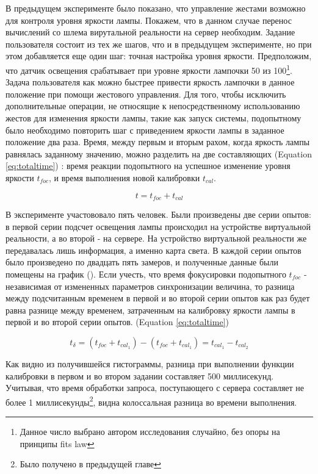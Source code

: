 В предыдущем эксперименте было показано, что управление жестами возможно для контроля уровня яркости лампы. Покажем, что в данном случае перенос вычислений со шлема вирутальной реальности на сервер необходим. Задание пользователя состоит из тех же шагов, что и в предыдущем эксперименте, но при этом добавляется еще один шаг: точная настройка уровня яркости. Предположим, что датчик освещения срабатывает при уровне яркости лампочки 50 из 100\footnote{Данное число выбрано автором исследования случайно, без опоры на принципы fits law}. Задача пользователя как можно быстрее привести яркость лампочки в данное положение при помощи жестового управления. Для того, чтобы исключить дополнительные операции, не относящие к непосредственному использованию жестов для изменения яркости лампы, такие как запуск системы, подопытному было необходимо повторить шаг с приведением яркости лампы в заданное положение два раза. Время, между первым и вторым рахом, когда яркость лампы равнялась заданному значению, можно разделить на две составляющих (Equation \eqref{eq:totaltime}) : время реакции подопытного на успешное изменение уровня яркости $t_{foc}$, и время выполнения новой калибровки $t_{cal}$.

\begin{equation}
  t = t_{foc} + t_{cal}
  \label{eq:totaltime}
\end{equation}

В эксперименте участововало пять человек. Были произведены две серии опытов: в первой серии подсчет освещения лампы происходил на устройстве виртуальной реальности, а во второй - на сервере. На устройство виртуальной реальности же передавалась лишь информация, а именно карта света. В каждой серии опытов было произведено по двадцать пять замеров, и полученные данные были помещены на график (). Если учесть, что время фокусировки подопытного $t_{foc}$ - независимая от измененных параметров синхронизации величина, то разница между подсчитанным временем в первой и во второй серии опытов как раз будет равна разнице между временем, затраченным на калибровку яркости лампы в первой и во второй серии опытов. (Equation \eqref{eq:totaltime})

\begin{equation}
  t_{\delta} = (t_{foc} + t_{cal_1}) - (t_{foc} + t_{cal_1}) = t_{cal_1} - t_{cal_2}
  \label{eq:deltatime}
\end{equation}

Как видно из получившейся гистограммы, разница при выполнении функции калибровки в первом и во втором задании составляет 500 миллисекунд. Учитывая, что время обработки запроса, поступающего с сервера составляет не более 1 миллисекунды\footnote{Было получено в предыдущей главе}, видна колоссальная разница во времени выполнения.

